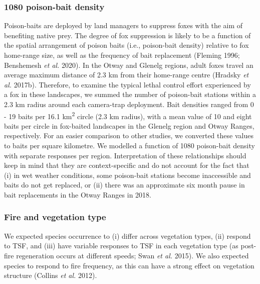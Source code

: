 \documentclass[]{elsarticle} %
\begin{document}
\hypertarget{poison-bait-density}{%
\subsubsection{1080 poison-bait density}\label{poison-bait-density}}

Poison-baits are deployed by land managers to suppress foxes with the aim of benefiting native prey. The degree of fox suppression is likely to be a function of the spatial arrangement of poison baits (i.e., poison-bait density) relative to fox home-range size, as well as the frequency of bait replacement (Fleming 1996; Benshemesh \emph{et al.} 2020). In the Otway and Glenelg regions, adult foxes travel an average maximum distance of 2.3 km from their home-range centre (Hradsky \emph{et al.} 2017b). Therefore, to examine the typical lethal control effort experienced by a fox in these landscapes, we summed the number of poison-bait stations within a 2.3 km radius around each camera-trap deployment. Bait densities ranged from 0 - 19 baits per 16.1 km\textsuperscript{2} circle (2.3 km radius), with a mean value of 10 and eight baits per circle in fox-baited landscapes in the Glenelg region and Otway Ranges, respectively. For an easier comparison to other studies, we converted these values to baits per square kilometre. We modelled a function of 1080 poison-bait density with separate responses per region. Interpretation of these relationships should keep in mind that they are context-specific and do not account for the fact that (i) in wet weather conditions, some poison-bait stations become inaccessible and baits do not get replaced, or (ii) there was an approximate six month pause in bait replacements in the Otway Ranges in 2018.

\hypertarget{fire-and-vegetation-type}{%
\subsubsection{Fire and vegetation type}\label{fire-and-vegetation-type}}

We expected species occurrence to (i) differ across vegetation types, (ii) respond to TSF, and (iii) have variable responses to TSF in each vegetation type (as post-fire regeneration occurs at different speeds; Swan \emph{et al.} 2015). We also expected species to respond to fire frequency, as this can have a strong effect on vegetation structure (Collins \emph{et al.} 2012).
\end{document}
